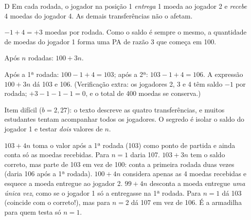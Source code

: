 \begin{resolucao}{D}
 Em cada rodada, o jogador na posição 1
\emph{entrega} 1 moeda ao jogador 2 e \emph{recebe} 4 moedas do jogador 4. As
demais transferências não o afetam.

 $-1 + 4 = +3$ moedas por rodada. Como o saldo é
sempre o mesmo, a quantidade de moedas do jogador 1 forma uma PA de razão 3
que começa em 100.

 Após $n$ rodadas: $100 + 3n$.

 Após a 1ª rodada:
$100 - 1 + 4 = 103$; após a 2ª: $103 - 1 + 4 = 106$. A expressão $100 + 3n$ dá
103 e 106. (Verificação extra: os jogadores 2, 3 e 4 têm saldo $-1$ por rodada;
$+3 - 1 - 1 - 1 = 0$, e o total de 400 moedas se conserva.)


Item difícil ($b = 2{,}27$): o texto descreve as quatro transferências, e
muitos estudantes tentam acompanhar todos os jogadores. O segredo é isolar o
saldo do jogador 1 e testar \emph{dois} valores de $n$.

\begin{distratores}
 $103 + 4n$ toma o valor após a 1ª rodada (103) como ponto de partida e
ainda conta só as moedas recebidas. Para $n = 1$ daria 107.
 $103 + 3n$ tem o saldo correto, mas parte de 103 em vez de 100: conta a
primeira rodada duas vezes (daria 106 após a 1ª rodada).
 $100 + 4n$ considera apenas as 4 moedas recebidas e esquece a moeda
entregue ao jogador 2.
 $99 + 4n$ desconta a moeda entregue \emph{uma única vez}, como se o
jogador 1 só a entregasse na 1ª rodada. Para $n = 1$ dá 103 (coincide com o
correto!), mas para $n = 2$ dá 107 em vez de 106. É a armadilha para quem testa
só $n = 1$.
\end{distratores}
\end{resolucao}

